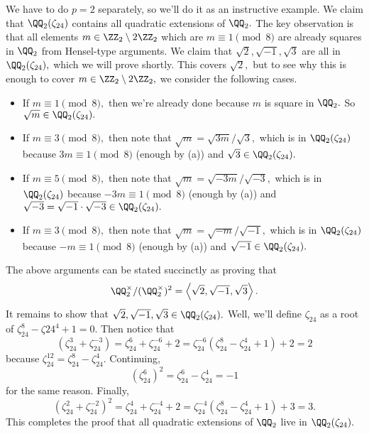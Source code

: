 We have to do $p=2$ separately, so we'll do it as an instructive example. We claim that $\QQ_2(\zeta_{24})$ contains all quadratic extensions of $\QQ_2.$ The key observation is that all elements $m\in\ZZ_2\setminus2\ZZ_2$ which are $m\equiv1\pmod8$ are already squares in $\QQ_2$ from Hensel-type arguments. We claim that $\sqrt2,\sqrt{-1},\sqrt3$ are all in $\QQ_2(\zeta_{24}),$ which we will prove shortly. This covers $\sqrt2,$ but to see why this is enough to cover $m\in\ZZ_2\setminus2\ZZ_2,$ we consider the following cases.
\begin{itemize}
    \item If $m\equiv1\pmod8,$ then we're already done because $m$ is square in $\QQ_2.$ So $\sqrt m\in\QQ_2(\zeta_{24}).$
    \item If $m\equiv3\pmod8,$ then note that $\sqrt m=\sqrt{3m}/\sqrt3,$ which is in $\QQ_2(\zeta_{24})$ because $3m\equiv1\pmod8$ (enough by (a)) and $\sqrt3\in\QQ_2(\zeta_{24}).$
    \item If $m\equiv5\pmod8,$ then note that $\sqrt m=\sqrt{-3m}/\sqrt{-3},$ which is in $\QQ_2(\zeta_{24})$ because $-3m\equiv1\pmod8$ (enough by (a)) and $\sqrt{-3}=\sqrt{-1}\cdot\sqrt{-3}\in\QQ_2(\zeta_{24}).$
    \item If $m\equiv3\pmod8,$ then note that $\sqrt m=\sqrt{-m}/\sqrt{-1},$ which is in $\QQ_2(\zeta_{24})$ because $-m\equiv1\pmod8$ (enough by (a)) and $\sqrt{-1}\in\QQ_2(\zeta_{24}).$
\end{itemize}
The above arguments can be stated succinctly as proving that
\[\QQ_2^\times/(\QQ_2^\times)^2=\left\langle\sqrt2,\sqrt{-1},\sqrt3\right\rangle.\]
It remains to show that $\sqrt2,\sqrt{-1},\sqrt3\in\QQ_2(\zeta_{24}).$ Well, we'll define $\zeta_{24}$ as a root of $\zeta_{24}^8-\zeta{24}^4+1=0.$ Then notice that
\[\left(\zeta_{24}^3+\zeta_{24}^{-3}\right)=\zeta_{24}^6+\zeta_{24}^{-6}+2=\zeta_{24}^{-6}\left(\zeta_{24}^8-\zeta_{24}^4+1\right)+2=2\]
because $\zeta_{24}^{12}=\zeta_{24}^8-\zeta_{24}^4.$ Continuing,
\[\left(\zeta_{24}^6\right)^2=\zeta_{24}^6-\zeta_{24}^4=-1\]
for the same reason. Finally,
\[\left(\zeta_{24}^2+\zeta_{24}^{-2}\right)^2=\zeta_{24}^4+\zeta_{24}^{-4}+2=\zeta_{24}^{-4}\left(\zeta_{24}^8-\zeta_{24}^4+1\right)+3=3.\]
This completes the proof that all quadratic extensions of $\QQ_2$ live in $\QQ_2(\zeta_{24}).$


